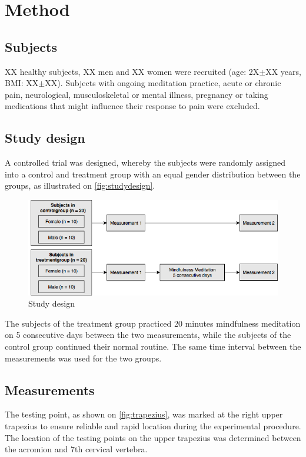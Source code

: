 \section{Method}
\subsection{Subjects}
XX healthy subjects, XX men and XX women were recruited (age: 2X$\pm$XX years, BMI: XX$\pm$XX). Subjects with ongoing meditation practice, acute or chronic pain, neurological, musculoskeletal or mental illness, pregnancy or taking medications that might influence their response to pain were excluded.

\subsection{Study design}
A controlled trial was designed, whereby the subjects were randomly assigned into a control and treatment group with an equal gender distribution between the groups, as illustrated on \autoref{fig:studydesign}.

\begin{figure}[H]
\centering
\includegraphics[width=1\columnwidth]{../figures/studydesign.png}
\caption{Study design}
\label{fig:studydesign}
\end{figure} \vspace{-.5cm}

The subjects of the treatment group practiced 20 minutes mindfulness meditation on 5 consecutive days between the two measurements, while the subjects of the control group continued their normal routine. The same time interval between the measurements was used for the two groups.

\subsection{Measurements}%
The testing point, as shown on \autoref{fig:trapezius}, was marked at the right upper trapezius to ensure reliable and rapid location during the experimental procedure. The location of the testing points on the upper trapezius was determined between the acromion and 7th cervical vertebra. 

